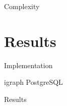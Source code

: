 \documentclass[xcolor=dvipsnames]{beamer}
\begin{document}
\begin{frame}{Complexity }



\end{frame}

\section{Results}
\begin{frame}{Implementation}

igraph  PostgreSQL
\end{frame}

\begin{frame}{Results}

\end{frame}
\end{document}
